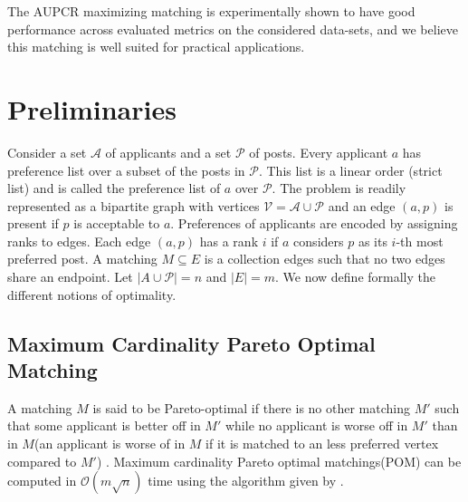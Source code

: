 \documentclass[letterpaper]{article} %
\begin{document}
The AUPCR maximizing matching is experimentally shown to have good performance across evaluated metrics on the considered data-sets, and we believe this matching is well suited for practical applications.

\section{Preliminaries}
Consider a set $\mathcal{A}$ of applicants and a set $\mathcal{P}$ of posts.
Every applicant $a$ has preference list over a subset of the posts in $\mathcal{P}$.
This list is a linear order (strict list) and is called the preference list of $a$ over $\mathcal{P}$.
The problem is readily represented as a bipartite graph with vertices $\mathcal{V} = \mathcal{A} \cup \mathcal{P}$ and
an edge $(a, p)$ is present if $p$ is acceptable to $a$.
Preferences of applicants are encoded by assigning ranks to edges.
Each edge $(a,p)$ has a rank $i$ if $a$ considers $p$ as its $i$-th most preferred post.
A matching $M \subseteq E$ is a collection edges such that no two edges share an endpoint.
Let $|A \cup \mathcal{P}| = n$ and $|E| = m$.
We now define formally the different notions of optimality.


\subsection{Maximum Cardinality Pareto Optimal Matching}
A matching $M$ is said to be Pareto-optimal if there is no other matching $M'$ such that some applicant is better off in $M'$ while no applicant is worse off in $M'$ than in $M$(an applicant is worse of in $M$ if it is matched to an less preferred vertex compared to $M'$) . Maximum cardinality Pareto optimal matchings(POM) can be computed in $\mathcal{O}(m\sqrt{n})$ time using the algorithm given by \cite{pareto}.
\end{document}
